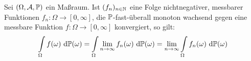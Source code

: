 \begin{satz}\label{satzMonotoneKonvergenz}\enter
Sei $(\Omega,\A,\P)$ ein Maßraum. Ist $(f_n)_{n\in\N}$ eine Folge nichtnegativer, messbarer Funktionen $f_n:\Omega\to[0,\infty]$, die $\P$-fast-überall monoton wachsend gegen eine messbare Funktion $f:\Omega\to[0,\infty]$ konvergiert, so gilt:
\begin{align*}
\int\limits_\Omega f(\omega)\d\P(\omega)=\int\limits_\Omega \limn f_n(\omega)\d\P(\omega)
=\limn\int\limits_\Omega f_n(\omega)\d\P(\omega)
\end{align*}
\end{satz}



